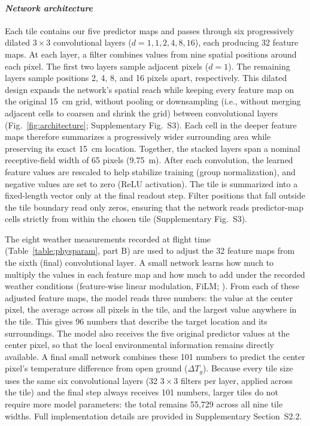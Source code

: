 \documentclass[12pt]{article}
\begin{document}
\paragraph*{\textit{Network architecture}}

Each tile contains our five predictor maps and passes through six progressively dilated $3\times3$ convolutional layers ($d = 1, 1, 2, 4, 8, 16$), each producing 32 feature maps. At each layer, a filter combines values from nine spatial positions around each pixel. The first two layers sample adjacent pixels ($d = 1$). The remaining layers sample positions 2, 4, 8, and 16 pixels apart, respectively. This dilated design \citep{yu_2016} expands the network's spatial reach while keeping every feature map on the original 15~cm grid, without pooling or downsampling (i.e., without merging adjacent cells to coarsen and shrink the grid) between convolutional layers (Fig.~\ref{fig:architecture}; Supplementary Fig.~S3). Each cell in the deeper feature maps therefore summarizes a progressively wider surrounding area while preserving its exact 15~cm location. Together, the stacked layers span a nominal receptive-field width of 65 pixels (9.75~m). After each convolution, the learned feature values are rescaled to help stabilize training (group normalization), and negative values are set to zero (ReLU activation). The tile is summarized into a fixed-length vector only at the final readout step. Filter positions that fall outside the tile boundary read only zeros, ensuring that the network reads predictor-map cells strictly from within the chosen tile (Supplementary Fig.~S3).

The eight weather measurements recorded at flight time (Table~\ref{table:physparam}, part B) are used to adjust the 32 feature maps from the sixth (final) convolutional layer. A small network learns how much to multiply the values in each feature map and how much to add under the recorded weather conditions (feature-wise linear modulation, FiLM; \citealt{perez_2018}). From each of these adjusted feature maps, the model reads three numbers: the value at the center pixel, the average across all pixels in the tile, and the largest value anywhere in the tile. This gives 96 numbers that describe the target location and its surroundings. The model also receives the five original predictor values at the center pixel, so that the local environmental information remains directly available. A final small network combines these 101 numbers to predict the center pixel's temperature difference from open ground ($\Delta T_g$). Because every tile size uses the same six convolutional layers (32 $3\times3$ filters per layer, applied across the tile) and the final step always receives 101 numbers, larger tiles do not require more model parameters: the total remains 55,729 across all nine tile widths. Full implementation details are provided in Supplementary Section~S2.2.
\end{document}
